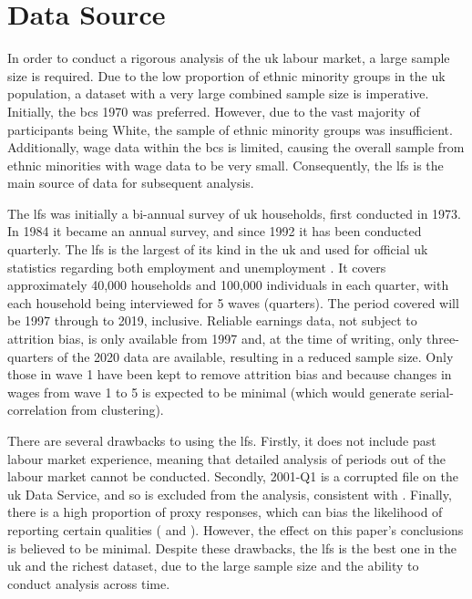 \documentclass[class=article, crop=false]{standalone}
\begin{document}
\section{Data Source}
\label{sec:Data}
In order to conduct a rigorous analysis of the \acrshort{uk} labour market, a large sample size is required. Due to the low proportion of ethnic minority groups in the \acrshort{uk} population, a dataset with a very large combined sample size is imperative. Initially, the \acrfull{bcs} 1970 was preferred. However, due to the vast majority of participants being White, the sample of ethnic minority groups was insufficient. Additionally, wage data within the \acrshort{bcs} is limited, causing the overall sample from ethnic minorities with wage data to be very small. Consequently, the \acrfull{lfs} is the main source of data for subsequent analysis.

The \acrshort{lfs} was initially a bi-annual survey of \acrshort{uk} households, first conducted in 1973. In 1984 it became an annual survey, and since 1992 it has been conducted quarterly. The \acrshort{lfs} is the largest of its kind in the \acrshort{uk} and used for official \acrshort{uk} statistics regarding both employment and unemployment \citep{ONS}. It covers approximately 40,000 households and 100,000 individuals in each quarter, with each household being interviewed for 5 waves (quarters). The period covered will be 1997 through to 2019, inclusive. Reliable earnings data, not subject to attrition bias, is only available from 1997 \citep{ONSa} and, at the time of writing, only three-quarters of the 2020 data are available, resulting in a reduced sample size. Only those in wave 1 have been kept to remove attrition bias and because changes in wages from wave 1 to 5 is expected to be minimal (which would generate serial-correlation from clustering).


There are several drawbacks to using the \acrshort{lfs}. Firstly, it does not include past labour market experience, meaning that detailed analysis of periods out of the labour market cannot be conducted. Secondly, 2001-Q1 is a corrupted file on the \acrshort{uk} Data Service, and so is excluded from the analysis, consistent with \citet{Longhi}. Finally, there is a high proportion of proxy responses, which can bias the likelihood of reporting certain qualities (\citet{Clarke} and \citet{Davies}). However, the effect on this paper's conclusions is believed to be minimal. Despite these drawbacks, the \acrshort{lfs} is the best one in the \acrshort{uk} and the richest dataset, due to the large sample size and the ability to conduct analysis across time.
\end{document}
